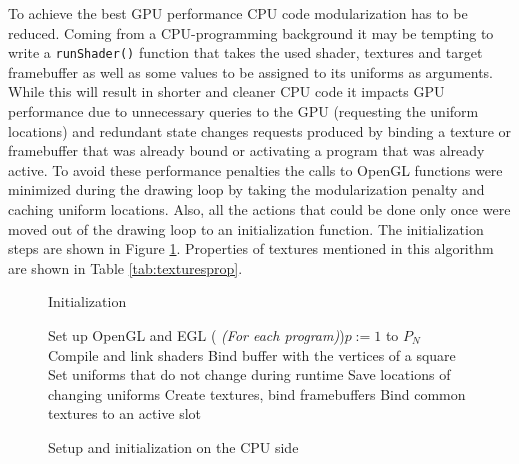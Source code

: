 \documentclass[conference]{IEEEtran}
\makeatletter
\newcommand{\removelatexerror}{\let\@latex@error\@gobble}
\makeatother
\begin{document}
To achieve the best GPU performance CPU code modularization has to be reduced. Coming from a CPU-programming background it may be tempting to write a \texttt{runShader()} function that takes the used shader, textures and target framebuffer as well as some values to be assigned to its uniforms as arguments. While this will result in shorter and cleaner CPU code it impacts GPU performance due to unnecessary queries to the GPU (requesting the uniform locations) and redundant state changes requests produced by binding a texture or framebuffer that was already bound or activating a program that was already active. To avoid these performance penalties the calls to OpenGL functions were minimized during the drawing loop by taking the modularization penalty and caching uniform locations. Also, all the actions that could be done only once were moved out of the drawing loop to an initialization function. The initialization steps are shown in Figure \ref{fig:alg:init}. Properties of textures mentioned in this algorithm are shown in Table \ref{tab:texturesprop}.

\begin{figure}[!t]
 \removelatexerror
 \begin{algorithm}[H]
  \caption{Initialization}
	Set up OpenGL and EGL\;
	\For( \emph{(For each program)}){$p := 1$ to $P_{N}$}
	{
		Compile and link shaders\;
		Bind buffer with the vertices of a square\;
		Set uniforms that do not change during runtime\;
		Save locations of changing uniforms\;
	}
	Create textures, bind framebuffers\;
	Bind common textures to an active slot\;
 \end{algorithm}
 \caption{Setup and initialization on the CPU side}
 \label{fig:alg:init}
\end{figure}
\end{document}
